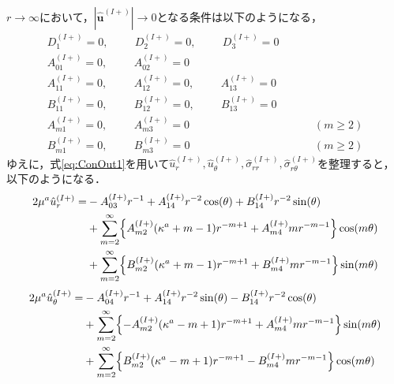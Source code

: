 $r\rightarrow\infty$において，$|\hat{\bm{u}}^{(I+)}|\rightarrow0$となる条件は以下のようになる，
\begin{align}
D_{1}^{(I+)}=0,\hspace{1cm}
D_{2}^{(I+)}=0,\hspace{1cm}
D_{3}^{(I+)}=0&
\nonumber
\\
A_{01}^{(I+)}=0,\hspace{1cm}A_{02}^{(I+)}=0&
\nonumber
\\
A_{11}^{(I+)}=0,\hspace{1cm}A_{12}^{(I+)}=0,\hspace{1cm}A_{13}^{(I+)}=0&
\nonumber
\\
B_{11}^{(I+)}=0,\hspace{1cm}B_{12}^{(I+)}=0,\hspace{1cm}B_{13}^{(I+)}=0&
\nonumber
\\
A_{m1}^{(I+)}=0,\hspace{1cm}A_{m3}^{(I+)}=0&\hspace{1cm}(m\geq2)
\nonumber
\\
B_{m1}^{(I+)}=0,\hspace{1cm}B_{m3}^{(I+)}=0&\hspace{1cm}(m\geq2)
\label{eq:ConOut1}
\end{align}
ゆえに，式\eqref{eq:ConOut1}を用いて$\hat{u}_{r}^{(I+)},\hat{u}_{\theta}^{(I+)},\hat{\sigma}_{rr}^{(I+)},\hat{\sigma}_{r\theta}^{(I+)}$を整理すると，以下のようになる．
\begin{align}
	2\mu^{a}\hat{u}_{r}^{(I+)} =&-A_{03}^{(I+)}r^{-1}
	+A_{14}^{(I+)}r^{-2}\cos(\theta)
	+B_{14}^{(I+)}r^{-2}\sin(\theta)
	\nonumber
	\\
	&+\sum_{m=2}^{\infty}\Bigl\{A_{m2}^{(I+)}(\kappa^{a}+m-1)r^{-m+1}
	+A_{m4}^{(I+)}mr^{-m-1}\Bigr\}\cos(m\theta)
	\nonumber
	\\
	&+\sum_{m=2}^{\infty}\Bigl\{B_{m2}^{(I+)}(\kappa^{a}+m-1)r^{-m+1}
	+B_{m4}^{(I+)}mr^{-m-1}\Bigr\}\sin(m\theta)
	\label{eq:UROut1}
\end{align}
\begin{align}
	2\mu^{a}\hat{u}_{\theta}^{(I+)} =&-A_{04}^{(I+)}r^{-1}
	+A_{14}^{(I+)}r^{-2}\sin(\theta)
	-B_{14}^{(I+)}r^{-2}\cos(\theta)
	\nonumber
	\\
	&+\sum_{m=2}^{\infty}\Bigl\{-A_{m2}^{(I+)}(\kappa^{a}-m+1)r^{-m+1}
	+A_{m4}^{(I+)}mr^{-m-1}\Bigr\}\sin(m\theta)
	\nonumber
	\\
	&+\sum_{m=2}^{\infty}\Bigl\{B_{m2}^{(I+)}(\kappa^{a}-m+1)r^{-m+1}
	-B_{m4}^{(I+)}mr^{-m-1}\Bigr\}\cos(m\theta)
	\label{eq:UThOut1}
\end{align}
